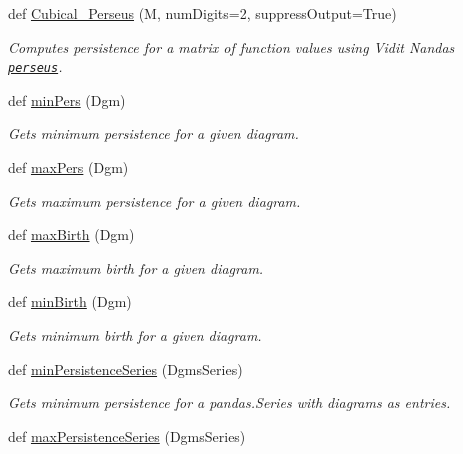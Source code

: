 \begin{DoxyCompactItemize}
\item 
def \hyperlink{namespaceteaspoon_1_1_t_d_a_1_1_persistence_aa583aa9a694aeaa3983e77319ac68e84}{Cubical\+\_\+\+Perseus} (M, num\+Digits=2, suppress\+Output=True)
\begin{DoxyCompactList}\small\item\em Computes persistence for a matrix of function values using Vidit Nanda\textquotesingle{}s \href{http://people.maths.ox.ac.uk/nanda/perseus/index.html}{\tt perseus}. \end{DoxyCompactList}\item 
def \hyperlink{namespaceteaspoon_1_1_t_d_a_1_1_persistence_aadc062063e1ed3050361dba5c7d47a0f}{min\+Pers} (Dgm)
\begin{DoxyCompactList}\small\item\em Gets minimum persistence for a given diagram. \end{DoxyCompactList}\item 
def \hyperlink{namespaceteaspoon_1_1_t_d_a_1_1_persistence_aff5b752e3141736e91e1386d28b3dfd5}{max\+Pers} (Dgm)
\begin{DoxyCompactList}\small\item\em Gets maximum persistence for a given diagram. \end{DoxyCompactList}\item 
def \hyperlink{namespaceteaspoon_1_1_t_d_a_1_1_persistence_aa91a12cbd748fc2f13944fbc653739d1}{max\+Birth} (Dgm)
\begin{DoxyCompactList}\small\item\em Gets maximum birth for a given diagram. \end{DoxyCompactList}\item 
def \hyperlink{namespaceteaspoon_1_1_t_d_a_1_1_persistence_a4cb4a0b96d87e48f0d1170fd0252a9ae}{min\+Birth} (Dgm)
\begin{DoxyCompactList}\small\item\em Gets minimum birth for a given diagram. \end{DoxyCompactList}\item 
def \hyperlink{namespaceteaspoon_1_1_t_d_a_1_1_persistence_a5ce3d1bee444c695661556eb59f70d90}{min\+Persistence\+Series} (Dgms\+Series)
\begin{DoxyCompactList}\small\item\em Gets minimum persistence for a pandas.\+Series with diagrams as entries. \end{DoxyCompactList}\item 
def \hyperlink{namespaceteaspoon_1_1_t_d_a_1_1_persistence_a6413fcc8a65a5422547f264331eb5c7d}{max\+Persistence\+Series} (Dgms\+Series)

\end{DoxyCompactItemize}
